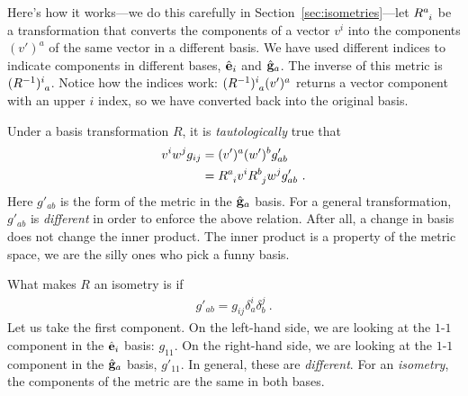 \documentclass[12pt, oneside]{report}    %
\begin{document}
Here's how it works---we do this carefully in Section~\ref{sec:isometries}---let $R\aij{a}{i}$ be a transformation that converts the components of a vector $v^i$ into the components $(v')^a$ of the same vector in a different basis. We have used different indices to indicate components in different bases, $\hat{\mathbf{e}}_i$ and $\hat{\mathbf{g}}_a$. The inverse of this metric is $(R\inv)\aij{i}{a}$. Notice how the indices work: $(R\inv)\aij{i}{a}(v')^a$ returns a vector component with an upper $i$ index, so we have converted back into the original basis.

Under a basis transformation $R$, it is \emph{tautologically} true that
\begin{align}
v^i w^j g_{ij}
&= (v')^a(w')^b g'_{ab} \\
&= R\aij{a}{i}v^i R\aij{b}{j}w^j g'_{ab} \ .
\label{eq:isometry:first:pass}
\end{align}
Here $g'_{ab}$ is the form of the metric in the $\hat{\mathbf{g}}_a$ basis. For a general transformation, $g'_{ab}$ is \emph{different} in order to enforce the above relation. After all, a change in basis does not change the inner product. The inner product is a property of the metric space, we are the silly ones who pick a funny basis. 

What makes $R$ an isometry is if
\begin{align}
    g'_{ab} = g_{ij}\delta^i_a \delta^j_b \ .
\end{align}
Let us take the first component. On the left-hand side, we are looking at the $1$-$1$component in the $\hat{\mathbf{e}}_i$ basis: $g_{11}$. On the right-hand side, we are looking at the $1$-$1$ component in the $\hat{\mathbf{g}}_a$ basis, $g'_{11}$. In general, these are \emph{different}. For an \emph{isometry}, the components of the metric are the same in both bases. 
\end{document}

